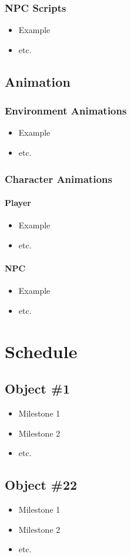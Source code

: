 \documentclass[14pt]{article}
\begin{document}
\subsubsection{NPC Scripts}
\begin{itemize}
    \item Example
    \item etc.
\end{itemize}

\subsection{Animation}
\subsubsection{Environment Animations}
\begin{itemize}
    \item Example
    \item etc.
\end{itemize}

\subsubsection{Character Animations}
\paragraph{Player}
\begin{itemize}
    \item Example
    \item etc.
\end{itemize}

\paragraph{NPC}
\begin{itemize}
    \item Example
    \item etc.
\end{itemize}

\pagebreak
\section{Schedule}
\subsection{Object \#1}
\begin{itemize}
    \item Milestone 1
    \item Milestone 2
    \item etc.
\end{itemize}

\subsection{Object \#22}
\begin{itemize}
    \item Milestone 1
    \item Milestone 2
    \item etc.
\end{itemize}
\end{document}
